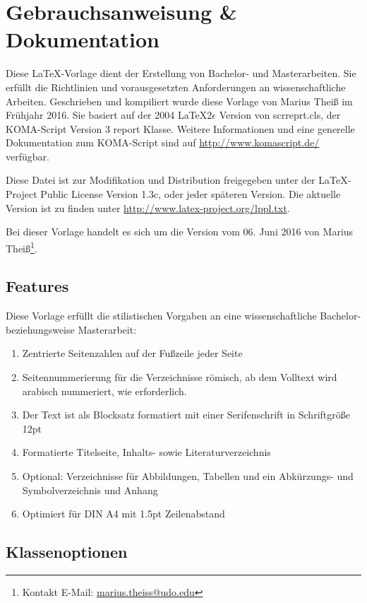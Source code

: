 
\chapter{Gebrauchsanweisung \& Dokumentation}
\label{chap:dokumentation}

Diese \LaTeX-Vorlage dient der Erstellung von Bachelor- und Masterarbeiten. Sie erfüllt die Richtlinien und vorausgesetzten Anforderungen an wissenschaftliche Arbeiten. Geschrieben und kompiliert wurde diese Vorlage von Marius Theiß im Frühjahr 2016. Sie basiert auf der 2004 \LaTeX2$\epsilon$ Version von scrreprt.cls, der KOMA-Script Version 3 report Klasse. Weitere Informationen und eine generelle Dokumentation zum KOMA-Script sind auf \url{http://www.komascript.de/} verfügbar.


Diese Datei ist zur Modifikation und Distribution freigegeben unter der \LaTeX-Project Public License Version 1.3c, oder jeder späteren Version. Die aktuelle Version ist zu finden unter \url{http://www.latex-project.org/lppl.txt}.

Bei dieser Vorlage handelt es sich um die Version vom 06. Juni 2016 von Marius Theiß\footnote{Kontakt E-Mail: \href{mailto:marius.theiss@udo.edu}{marius.theiss@udo.edu}}.


\section{Features}
\label{sec:features}

Diese Vorlage erfüllt die stilistischen Vorgaben an eine wissenschaftliche Bachelor- beziehungsweise Masterarbeit:
\begin{enumerate}
\item Zentrierte Seitenzahlen auf der Fußzeile jeder Seite
\item Seitennummerierung für die Verzeichnisse römisch, ab dem Volltext wird arabisch nummeriert, wie erforderlich.
\item Der Text ist als Blocksatz formatiert mit einer Serifenschrift in Schriftgröße 12pt
\item Formatierte Titelseite, Inhalts- sowie Literaturverzeichnis
\item Optional: Verzeichnisse für Abbildungen, Tabellen und ein Abkürzungs- und Symbolverzeichnis und Anhang
\item Optimiert für DIN A4 mit 1.5pt Zeilenabstand
\end{enumerate}


\section{Klassenoptionen}
\label{sec:optionen}

